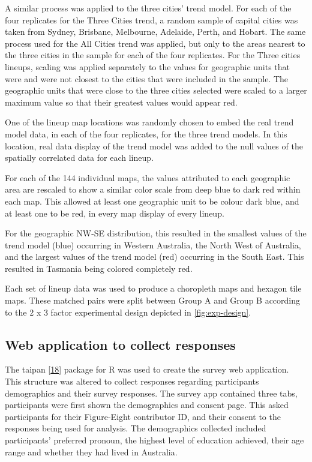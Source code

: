 \documentclass[conference,final,]{IEEEtran}
\begin{document}
A similar process was applied to the three cities' trend model. For each of the four replicates for the Three Cities trend, a random sample of capital cities was taken from Sydney, Brisbane, Melbourne, Adelaide, Perth, and Hobart.
The same process used for the All Cities trend was applied, but only to the areas nearest to the three cities in the sample for each of the four replicates.
For the Three cities lineups, scaling was applied separately to the values for geographic units that were and were not closest to the cities that were included in the sample. The geographic units that were close to the three cities selected were scaled to a larger maximum value so that their greatest values would appear red.

One of the lineup map locations was randomly chosen to embed the real trend model data, in each of the four replicates, for the three trend models.
In this location, real data display of the trend model was added to the null values of the spatially correlated data for each lineup.

For each of the 144 individual maps, the values attributed to each geographic area are rescaled to show a similar color scale from deep blue to dark red within each map.
This allowed at least one geographic unit to be colour dark blue, and at least one to be red, in every map display of every lineup.

For the geographic NW-SE distribution, this resulted in the smallest values of the trend model (blue) occurring in Western Australia, the North West of Australia, and the largest values of the trend model (red) occurring in the South East. This resulted in Tasmania being colored completely red.

Each set of lineup data was used to produce a choropleth maps and hexagon tile maps. These matched pairs were split between Group A and Group B according to the 2 x 3 factor experimental design depicted in \ref{fig:exp-design}.

\hypertarget{web-application-to-collect-responses}{%
\subsection{Web application to collect responses}\label{web-application-to-collect-responses}}

The taipan {[}\protect\hyperlink{ref-taipan}{18}{]} package for R was used to create the survey web application.
This structure was altered to collect responses regarding participants demographics and their survey responses.
The survey app contained three tabs, participants were first shown the demographics and consent page.
This asked participants for their Figure-Eight contributor ID, and their consent to the responses being used for analysis. The demographics collected included participants' preferred pronoun, the highest level of education achieved, their age range and whether they had lived in Australia.
\end{document}
